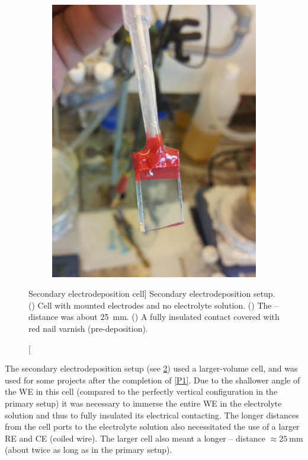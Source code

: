 \documentclass[webedition,openright,titles,swedish,english]{LuaUUThesis}\usepackage[]{graphicx}\usepackage[]{xcolor}
\begin{document}
\begin{figure}[tbp]
\begin{subfigure}[b]{0.25\linewidth}
   \includegraphics[width=\textwidth]{synthesis/electrodeposition/0311110433-cropped.jpg}
   \caption{}
   \label{fig:0301-ED-electrode-insulated}
\end{subfigure}%
\caption%
[Secondary electrodeposition cell]{%
   Secondary electrodeposition setup.
   ()
   Cell with mounted electrodes and no electrolyte solution.
   ()
   The -- distance was about \qty{25}{\mm}.
   ()
   A fully insulated contact covered with red nail varnish (pre-deposition).
}
\label{fig:0301-ED-cell-autolab}
\end{figure}

The secondary electrodeposition setup (see \cref{fig:0301-ED-cell-autolab}) used
a larger-volume cell, and was used for some projects after the completion of \cref{P1}.
Due to the shallower angle of the \gls{WE} in this cell (compared to the perfectly
vertical configuration in the primary setup) it was necessary to immerse the
entire \gls{WE} in the electrolyte solution and thus to fully insulated its electrical
contacting.
The longer distances from the cell ports to the electrolyte solution also
necessitated the use of a larger \gls{RE} and \gls{CE} (coiled  wire).
The larger cell also meant a longer -- distance
$\approx\qty{25}{\mm}$ (about twice as long as in the primary setup).
\end{document}

